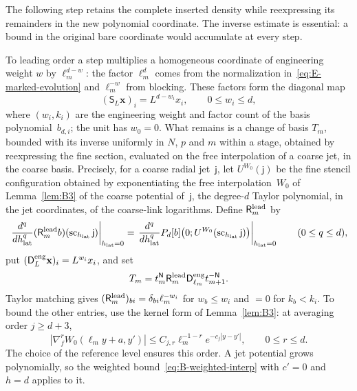 The following step retains the complete inserted density while reexpressing its remainders in the new polynomial coordinate. The inverse estimate is essential: a bound in the original bare coordinate would accumulate at every step.

To leading order a step multiplies a homogeneous coordinate of engineering weight $w$ by $\ell_m^{d-w}$: the factor $\ell_m^d$ comes from the normalization in~\eqref{eq:E-marked-evolution} and $\ell_m^{-w}$ from blocking. These factors form the diagonal map
\begin{equation*}
 (\mathsf S_L\mathbf x)_i=L^{d-w_i}x_i,
 \qquad 0\le w_i\le d,
\end{equation*}
where $(w_i,k_i)$ are the engineering weight and factor count of the basis polynomial~$b_{d,i}$; the unit has $w_0=0$. What remains is a change of basis $T_m$, bounded with its inverse uniformly in $N$, $p$ and $m$ within a stage, obtained by reexpressing the fine section, evaluated on the free interpolation of a coarse jet, in the coarse basis. Precisely, for a coarse radial jet~$\mathsf j$, let $U^{W_0}(\mathsf j)$ be the fine stencil configuration obtained by exponentiating the free interpolation~$W_0$ of Lemma~\ref{lem:B3} of the coarse potential of~$\mathsf j$, the degree-$d$ Taylor polynomial, in the jet coordinates, of the coarse-link logarithms. Define $\mathsf R^{\rm lead}_m$ by
\begin{equation*}
 \left.\frac{d^q}{dh_{\rm lat}^q}(\mathsf R^{\rm lead}_mb)(\operatorname{sc}_{h_{\rm lat}}\mathsf j)\right|_{h_{\rm lat}=0}
 =\left.\frac{d^q}{dh_{\rm lat}^q}P_d[b]\bigl(0;U^{W_0}(\operatorname{sc}_{h_{\rm lat}}\mathsf j)\bigr)\right|_{h_{\rm lat}=0}
 \qquad(0\le q\le d),
\end{equation*}
put $(\mathsf D^{\rm eng}_L\mathbf x)_i=L^{w_i}x_i$, and set
\begin{equation*}
 T_m=t_m^{\mathsf{N}}\mathsf R^{\rm lead}_m\mathsf D^{\rm eng}_{\ell_m}t_{m+1}^{-\mathsf{N}}.
\end{equation*}
Taylor matching gives $(\mathsf R^{\rm lead}_m)_{bi}=\delta_{bi}\ell_m^{-w_i}$ for $w_b\le w_i$ and $=0$ for $k_b<k_i$. To bound the other entries, use the kernel form of Lemma~\ref{lem:B3}: at averaging order $j\ge d+3$,
\begin{equation*}
 |\nabla_f^rW_0(\ell_my+a,y')|
 \le C_{j,r}\ell_m^{-1-r}e^{-c_j|y-y'|},\qquad 0\le r\le d.
\end{equation*}
The choice of the reference level ensures this order. A jet potential grows polynomially, so the weighted bound~\eqref{eq:B-weighted-interp} with $c'=0$ and $h=d$ applies to it.
